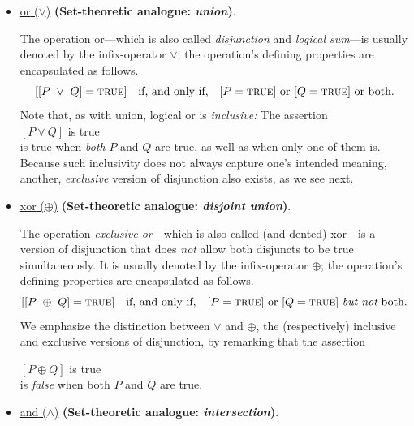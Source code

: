 \begin{itemize}
\item
\underline{{\sc or} ($\vee$)}
{\bf (Set-theoretic analogue: {\em union})}.

The operation {\sc or}---which is also called {\em disjunction} and
{\em logical sum}---is usually denoted by the infix-operator $\vee$;
the operation's defining properties are encapsulated as follows.
\[
[[P \ \vee \ Q] =  \mbox{\sc true}] \ \ \mbox{ if, and only if, } \ \ 
[P = \mbox{\sc true}] \mbox{ or }
[Q = \mbox{\sc true}] \mbox{ or both}.
\]
Note that, as with union, logical {\sc or} is {\em inclusive:}
The assertion \\
\hspace*{.35in}$[P \vee Q]$ is \mbox{\sc true} \\
%
is true when {\em both} $P$ and $Q$ are true, as well as when only one
of them is.  Because such inclusivity does not always capture one's
intended meaning, another, {\em exclusive} version of disjunction also
exists, as we see next.

\item 
\underline{{\sc xor} ($\oplus$)}
{\bf (Set-theoretic analogue: {\em disjoint union})}.

The operation {\em exclusive or}---which is also called (and dented)
{\sc xor}---is a version of disjunction that does {\em not} allow both
disjuncts to be true simultaneously.  It is usually denoted by the
infix-operator $\oplus$; the operation's defining properties are
encapsulated as follows.
\[
[[P \ \oplus \ Q] =  \mbox{\sc true}] \ \ \mbox{ if, and only if, } \ \ 
[P = \mbox{\sc true}] \mbox{ or }
[Q = \mbox{\sc true}] \mbox{ {\em but not} both}.
\]
We emphasize the distinction between $\vee$ and $\oplus$, the
(respectively) inclusive and exclusive versions of disjunction, by
remarking that the assertion

\hspace*{.35in}$[P \oplus Q]$ is \mbox{\sc true} \\

\noindent
is {\em false} when both $P$ and $Q$ are true.

\item
\underline{{\sc and} ($\wedge$)}
{\bf (Set-theoretic analogue: {\em intersection})}.


\end{itemize}
